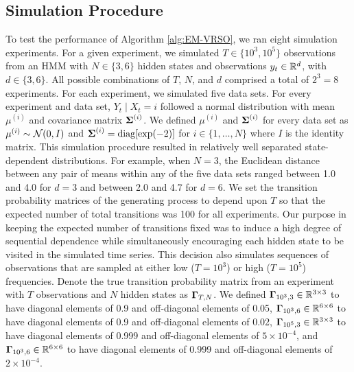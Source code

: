
\subsection{Simulation Procedure}

To test the performance of Algorithm \ref{alg:EM-VRSO}, we ran eight simulation experiments. For a given experiment, we simulated $T \in \{10^3,10^5\}$ observations from an HMM with $N \in \{3,6\}$ hidden states and observations $y_t \in \mathbb{R}^d$, with $d \in \{3,6\}$. All possible combinations of $T$, $N$, and $d$ comprised a total of $2^3 = 8$ experiments. For each experiment, we simulated five data sets. For every experiment and data set, $Y_t \mid X_t = i$ followed a normal distribution with mean $\mu^{(i)}$ and covariance matrix $\boldsymbol{\Sigma}^{(i)}$. We defined $\mu^{(i)}$ and $\boldsymbol{\Sigma}^{(i)}$ for every data set as $\mu^{(i)} \sim \mathcal{N}(0,I)$ and $\boldsymbol{\Sigma}^{(i)} = \text{diag}[\exp(-2)]$ for $i \in \{1,\ldots,N\}$ where $I$ is the identity matrix. This simulation procedure resulted in relatively well separated state-dependent distributions. For example, when $N = 3$, the Euclidean distance between any pair of means within any of the five data sets ranged between 1.0 and 4.0 for $d = 3$ and between 2.0 and 4.7 for $d = 6$.
%
We set the transition probability matrices of the generating process to depend upon $T$ so that the expected number of total transitions was 100 for all experiments. Our purpose in keeping the expected number of transitions fixed was to induce a high degree of sequential dependence while simultaneously encouraging each hidden state to be visited in the simulated time series. This decision also simulates sequences of observations that are sampled at either low ($T=10^3$) or high ($T=10^5$) frequencies.
%
Denote the true transition probability matrix from an experiment with $T$ observations and $N$ hidden states as $\boldsymbol{\Gamma}_{T,N}$. We defined $\boldsymbol{\Gamma}_{10^3,3} \in \mathbb{R}^{3 \times 3}$ to have diagonal elements of 0.9 and off-diagonal elements of 0.05, $\boldsymbol{\Gamma}_{10^3,6} \in \mathbb{R}^{6 \times 6}$ to have diagonal elements of 0.9 and off-diagonal elements of 0.02, $\boldsymbol{\Gamma}_{10^5,3} \in \mathbb{R}^{3 \times 3}$ to have diagonal elements of 0.999 and off-diagonal elements of $5 \times 10^{-4}$, and $\boldsymbol{\Gamma}_{10^3,6} \in \mathbb{R}^{6 \times 6}$ to have diagonal elements of 0.999 and off-diagonal elements of $2 \times 10^{-4}$. 
